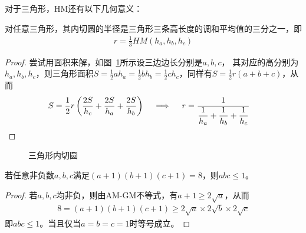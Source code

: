 对于三角形，HM还有以下几何意义：
\begin{example}
  对任意三角形，其内切圆的半径是三角形三条高长度的调和平均值的三分之一，即
  \begin{align*}
    r=\frac13 HM(h_a,h_b,h_c)
  \end{align*}
\end{example}
\begin{proof}
  尝试用面积来解，如图~\ref{fig:incircle}所示设三边边长分别是$a,b,c$，
  其对应的高分别为 $h_a, h_b, h_c$，则三角形面积$S=\frac12
  ah_a = \frac12 bh_b = \frac12 ch_c$，同样有$S=\frac12 r(a+b+c)$，从而
  \begin{align*}
    & S = \frac12 r\left( \frac{2S}{h_c} +\frac{2S}{h_a} + \frac{2S}{h_b} \right)
    \quad \implies\quad  r=\frac{1}{\dfrac1{h_a} + \dfrac1{h_b} + \dfrac1{h_c}} \qedhere
  \end{align*}
\end{proof}

\begin{figure}[htbp]
  \centering
  \caption{三角形内切圆}
  \label{fig:incircle}
\end{figure}

\begin{example}
  若任意非负数$a,b,c$满足$(a+1)(b+1)(c+1)=8$，则$abc\le 1$。
\end{example}
\begin{proof}
  若$a,b,c$均非负，则由AM-GM不等式，有$a+1\ge 2\sqrt{a}$，从而
  \begin{align*}
    8=(a+1)(b+1)(c+1)\ge 2\sqrt{a}\times 2\sqrt{b} \times 2\sqrt{c}
  \end{align*}
  即$abc\le1$。当且仅当$a=b=c=1$时等号成立。
\end{proof}

